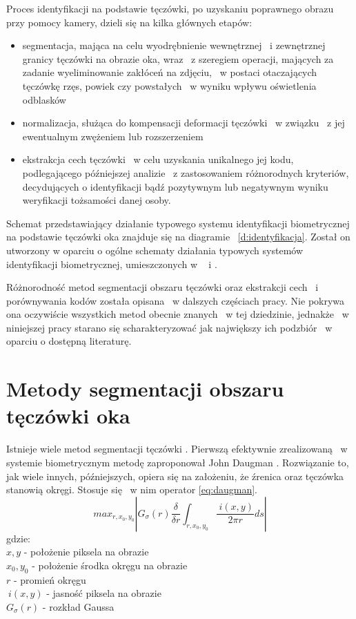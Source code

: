 Proces identyfikacji na podstawie tęczówki, po uzyskaniu poprawnego obrazu przy pomocy kamery, dzieli się na kilka głównych etapów: \begin{itemize}
\item segmentacja, mająca na celu wyodrębnienie wewnętrznej ~i zewnętrznej granicy tęczówki na obrazie oka, wraz ~z szeregiem operacji, mających za zadanie wyeliminowanie zakłóceń na zdjęciu, ~w postaci otaczających tęczówkę rzęs, powiek czy powstałych ~w wyniku wpływu oświetlenia odblasków
\item normalizacja, służąca do kompensacji deformacji tęczówki ~w związku ~z jej ewentualnym zwężeniem lub rozszerzeniem 
\item ekstrakcja cech tęczówki ~w celu uzyskania unikalnego jej kodu, podlegającego późniejszej analizie ~z zastosowaniem różnorodnych kryteriów, decydujących o identyfikacji bądź pozytywnym lub negatywnym wyniku weryfikacji tożsamości danej osoby.
\end{itemize}

Schemat przedstawiający działanie typowego systemu identyfikacji biometrycznej na podstawie tęczówki oka znajduje się na diagramie ~\ref{d:identyfikacja}. Został on utworzony w oparciu o ogólne schematy działania typowych systemów identyfikacji biometrycznej, umieszczonych w ~\cite{Bio02} i \cite{Jain00}.

Różnorodność metod segmentacji obszaru tęczówki oraz ekstrakcji cech ~i porównywania kodów została opisana ~w dalszych częściach pracy. Nie pokrywa ona oczywiście wszystkich metod obecnie znanych ~w tej dziedzinie, jednakże ~w niniejszej pracy starano się scharakteryzować jak największy ich podzbiór ~w oparciu o dostępną literaturę.


\section{Metody segmentacji obszaru tęczówki oka}
\label{sec:segmentacja}

Istnieje wiele metod segmentacji tęczówki \cite{PrAl06}. Pierwszą efektywnie zrealizowaną ~w systemie biometrycznym metodę zaproponował John Daugman \cite{Daugman}. Rozwiązanie to, jak wiele innych, późniejszych, opiera się na założeniu, że źrenica oraz tęczówka stanowią okręgi. Stosuje się ~w nim operator \ref{eq:daugman}.
\begin{equation}
\label{eq:daugman}
max_{r,x_{0},y_{0}}\left| G_{\sigma}(r) \frac{\delta}{\delta r}\int_{r,x_{0},y_{0}} \frac{~i(x,y)}{2\pi r}ds \right|
\end{equation}
gdzie:\\
$ x,y $ - położenie piksela na obrazie \\
$ x_{0}, y_{0} $ - położenie środka okręgu na obrazie \\
$ r $ - promień okręgu \\
$ ~i(x,y) $ - jasność piksela na obrazie\\
$ G_{\sigma}(r) $ - rozkład Gaussa\\

